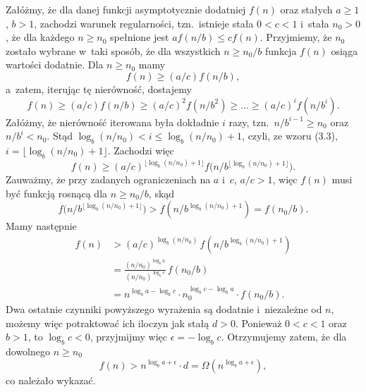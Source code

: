 \exercise %

\noindent Załóżmy, że dla danej funkcji asymptotycznie dodatniej $f(n)$ oraz stałych $a\ge1$, $b>1$, zachodzi warunek regularności, tzn.\ istnieje stała $0<c<1$ i~stała $n_0>0$, że dla każdego $n\ge n_0$ spełnione jest $af(n/b)\le cf(n)$.
Przyjmiemy, że $n_0$ zostało wybrane w~taki sposób, że dla wszystkich $n\ge n_0/b$ funkcja $f(n)$ osiąga wartości dodatnie.
Dla $n\ge n_0$ mamy
\[
	f(n) \ge (a/c)f(n/b),
\]
a~zatem, iterując tę nierówność, dostajemy
\[
	f(n) \ge (a/c)f(n/b) \ge (a/c)^2f(n/b^2) \ge \dots \ge (a/c)^if(n/b^i).
\]
Załóżmy, że nierówność iterowana była dokładnie $i$ razy, tzn.\ $n/b^{i-1}\ge n_0$ oraz $n/b^i<n_0$.
Stąd $\log_b(n/n_0)<i\le\log_b(n/n_0)+1$, czyli, ze wzoru (3.3), $i=\lfloor\log_b(n/n_0)+1\rfloor$.
Zachodzi więc
\[
	f(n) \ge (a/c)^{\lfloor\log_b(n/n_0)+1\rfloor}f\bigl(n/b^{\lfloor\log_b(n/n_0)+1\rfloor}\bigr).
\]
Zauważmy, że przy zadanych ograniczeniach na $a$ i~$c$, $a/c>1$, więc $f(n)$ musi być funkcją rosnącą dla $n\ge n_0/b$, skąd
\[
	f\bigl(n/b^{\lfloor\log_b(n/n_0)+1\rfloor}\bigr) > f(n/b^{\log_b(n/n_0)+1}) = f(n_0/b).
\]
Mamy następnie
\begin{align*}
	f(n) &> (a/c)^{\log_b(n/n_0)}\,f(n/b^{\log_b(n/n_0)+1}) \\[1mm]
	&= \frac{(n/n_0)^{\log_ba}}{(n/n_0)^{\log_bc}}\,f(n_0/b) \\[1mm]
	&= n^{\log_ba-\log_bc}\cdot n_0^{\log_bc-\log_ba}\cdot f(n_0/b).
\end{align*}
Dwa ostatnie czynniki powyższego wyrażenia są dodatnie i~niezależne od $n$, możemy więc potraktować ich iloczyn jak stałą $d>0$.
Ponieważ $0<c<1$ oraz $b>1$, to $\log_bc<0$, przyjmijmy więc $\epsilon=-\log_bc$.
Otrzymujemy zatem, że dla dowolnego $n\ge n_0$
\[
	f(n) > n^{\log_ba+\epsilon}\cdot d = \Omega(n^{\log_ba+\epsilon}),
\]
co należało wykazać.
